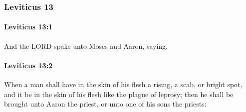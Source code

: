 	\subsubsection{Leviticus 13} %
		\label{LEVITICUS-13}

		\paragraph{Leviticus 13:1} %
			\label{LEVITICUS-13-1}

			And the LORD spake unto Moses and Aaron, saying,


		\paragraph{Leviticus 13:2} %
			\label{LEVITICUS-13-2}

			When a man shall have in the skin of his flesh a rising, a scab, or bright spot, and it be in the skin of his flesh like the plague of leprosy; then he shall be brought unto Aaron the priest, or unto one of his sons the priests:

